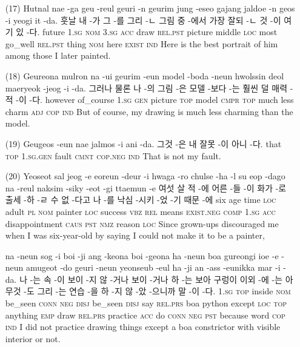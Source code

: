 \begin{itemize}
\item [(17)]
\tgl
		{Hutnal nae -ga geu -reul geuri -n geurim jung -eseo gajang jaldoe -n geos -i yeogi it -da.}
		{훗날 내 -가 그 -를 그리 -ㄴ 그림 중 -에서 가장 잘되 -ㄴ 것 -이 여기 있 -다.}
		{future	\textsc{1.sg}	\textsc{nom}	\textsc{3.sg}	\textsc{acc}	draw	\textsc{rel.pst}	picture	middle	\textsc{loc}	most	go\_well	\textsc{rel.pst}	thing	\textsc{nom}	here	\textsc{exist}	\textsc{ind}}
		{Here is the best portrait of him among those I later painted.}
		
\item [(18)]
\tgl
		{Geureona mulron na -ui geurim -eun model -boda -neun hwolssin deol maeryeok -jeog -i -da.}
		{그러나 물론 나 -의 그림 -은 모델 -보다 -는 훨씬 덜 매력 -적 -이 -다.}
		{however	of\_course	\textsc{1.sg}	\textsc{gen}	picture	\textsc{top}	model	\textsc{cmpr}	\textsc{top}	much	less	charm	\textsc{adj}	\textsc{cop}	\textsc{ind}}
		{But of course, my drawing is much less charming than the model.}
		
\item [(19)]
\tgl
		{Geugeos -eun nae jalmos -i ani -da.}
		{그것 -은 내 잘못 -이 아니 -다.}
		{that	\textsc{top}	\textsc{1.sg.gen}	fault	\textsc{cmnt}	\textsc{cop.neg}	\textsc{ind}}
		{That is not my fault.}
		
\item [(20)]
\tgl
		{Yeoseot sal jeog -e eoreun -deur -i hwaga -ro chulse -ha -l su eop -dago na -reul naksim -siky -eot -gi ttaemun -e}
		{여섯 살 적 -에 어른 -들 -이 화가 -로 출세 -하 -ㄹ 수 없 -다고 나 -를 낙심 -시키 -었 -기 때문 -에}
		{six	age	time	\textsc{loc}	adult	\textsc{pl}	\textsc{nom}	painter	\textsc{loc}	success	\textsc{vbz}	\textsc{rel}	means	\textsc{exist.neg}	\textsc{comp}	\textsc{1.sg}	\textsc{acc}	disappointment	\textsc{caus}	\textsc{pst}	\textsc{nmz}	reason	\textsc{loc}}
		{Since grown-ups discouraged me when I was six-year-old by saying I could not make it to be a painter,}
		
\tgl
		{na -neun sog -i boi -ji ang -keona boi -geona ha -neun boa gureongi ioe -e -neun amugeot -do geuri -neun yeonseub -eul ha -ji an -ass -eunikka mar -i -da.}
		{나 -는 속 -이 보이 -지 않 -거나 보이 -거나 하 -는 보아 구렁이 이외 -에 -는 아무것 -도 그리 -는 연습 -을 하 -지 않 -았 -으니까 말 -이 -다.}
		{\textsc{1.sg}	\textsc{top}	inside	\textsc{nom}	be\_seen	\textsc{conn}	\textsc{neg}	\textsc{disj}	be\_seen	\textsc{disj}	say	\textsc{rel.prs}	boa	python	except	\textsc{loc}	\textsc{top}	anything	\textsc{emp}	draw	\textsc{rel.prs}	practice	\textsc{acc}	do	\textsc{conn}	\textsc{neg}	\textsc{pst}	because	word	\textsc{cop}	\textsc{ind}}
		{I did not practice drawing things except a boa constrictor with visible interior or not.}


\end{itemize}

